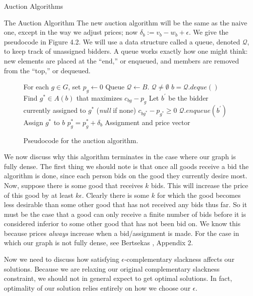 \begin{section}{Auction Algorithms}
\begin{subsection}{The Auction Algorithm}
		The new auction algorithm will be the same as the naive one, except in the way we 
		adjust prices; now $\delta_b := v_b - w_b + \epsilon$. We give the pseudocode in 
		Figure 4.2. We will use a data structure called a queue, denoted $\mathcal{Q}$, to 
		keep track of unassigned bidders. A queue works exactly how one might think: new 
		elements are placed at the ``end,'' or enqueued, and members are removed from the 
		``top,'' or dequeued.
		\begin{figure}[h]
		\begin{center}
			\begin{minipage}{3in}
			\begin{codebox}
				\li For each $g\in G$, set $p_g \gets 0$
				\li Queue $\mathcal{Q} \gets B$.
				\li \While $\mathcal{Q}\neq \emptyset$
					\Do
				\li		$b = \mathcal{Q}.deque()$
				\li		Find $g^{*}\in A(b)$ that maximizes $c_{bg} - p_{g}$
				\li		Let $b^{'}$ be the bidder currently assigned to $g^{*}$ 
				(\emph{null} if none)
				\li		\If $c_{bg^{*}} - p_{g^{*}} \geq 0$
							\Then
				\li				$\mathcal{Q}.enqueue(b^{'})$
				\li				Assign $g^{*}$ to $b$
				\li				$p_g^{*} = p_g^{*} + \delta_b$
							\End
					\End
				\li \Return Assignment and price vector
			\end{codebox}
			\end{minipage}
			\caption{Pseudocode for the auction algorithm.}
		\end{center}
		\end{figure}

		We now discuss why this algorithm terminates in the case where our graph is fully dense.
		The first thing we should note is that once all goods 
		receive a bid the algorithm is done, since each person bids on the good they 
		currently desire most. Now, suppose there is some good that receives $k$ bids. This will 
		increase the price of this good by at least $k\epsilon$. Clearly there is some $k$ for 
		which the good becomes less desirable than some other good that has not received any bids 
		thus far. So it must be the case that a good can only receive a finite number of 
		bids before it is considered inferior to some other good that has not been bid on. We 
		know this because prices \emph{always} increase when a bid/assignment is made. For 
		the case in which our graph is not fully dense, see Bertsekas \cite{Bertsekas1992}, 
		Appendix 2.
	
		Now we need to discuss how satisfying $\epsilon$-complementary slackness affects our 
		solutions. Because we are relaxing our original complementary slackness constraint, 
		we should not in general expect to get optimal solutions. 
		In fact, optimality of our solution relies entirely on 
		how we choose our $\epsilon$. 
		

\end{subsection}
\end{section}
